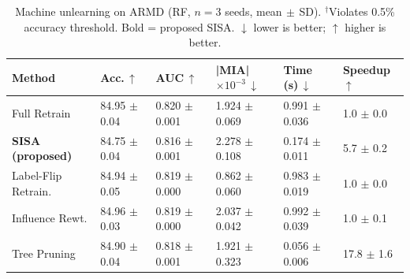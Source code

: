 \begin{table}[htbp]
\centering
\caption{Machine unlearning on ARMD (RF, $n=3$ seeds, mean$\,\pm\,$SD). $^\dagger$Violates 0.5\% accuracy threshold. Bold = proposed SISA. $\downarrow$ lower is better; $\uparrow$ higher is better.}
\label{tab:armd_rf}
\renewcommand{\arraystretch}{1.25}
\begin{tabular}{L{3.2cm} C{2.3cm} C{2.0cm} C{2.2cm} C{2.4cm} C{1.8cm}}
\toprule
\textbf{Method} & \textbf{Acc.\,$\uparrow$} & \textbf{AUC\,$\uparrow$} & \textbf{|MIA|$\times10^{-3}$\,$\downarrow$} & \textbf{Time (s)\,$\downarrow$} & \textbf{Speedup\,$\uparrow$} \\
\midrule
Full Retrain & 84.95 $\pm$ 0.04 & 0.820 $\pm$ 0.001 & 1.924 $\pm$ 0.069 & 0.991 $\pm$ 0.036 & 1.0 $\pm$ 0.0 \\
\textbf{SISA (proposed)} & 84.75 $\pm$ 0.04 & 0.816 $\pm$ 0.001 & 2.278 $\pm$ 0.108 & 0.174 $\pm$ 0.011 & 5.7 $\pm$ 0.2 \\
Label-Flip Retrain. & 84.94 $\pm$ 0.05 & 0.819 $\pm$ 0.000 & 0.862 $\pm$ 0.060 & 0.983 $\pm$ 0.019 & 1.0 $\pm$ 0.0 \\
Influence Rewt. & 84.96 $\pm$ 0.03 & 0.819 $\pm$ 0.000 & 2.037 $\pm$ 0.042 & 0.992 $\pm$ 0.039 & 1.0 $\pm$ 0.1 \\
Tree Pruning & 84.90 $\pm$ 0.04 & 0.818 $\pm$ 0.001 & 1.921 $\pm$ 0.323 & 0.056 $\pm$ 0.006 & 17.8 $\pm$ 1.6 \\
\bottomrule
\end{tabular}
\end{table}